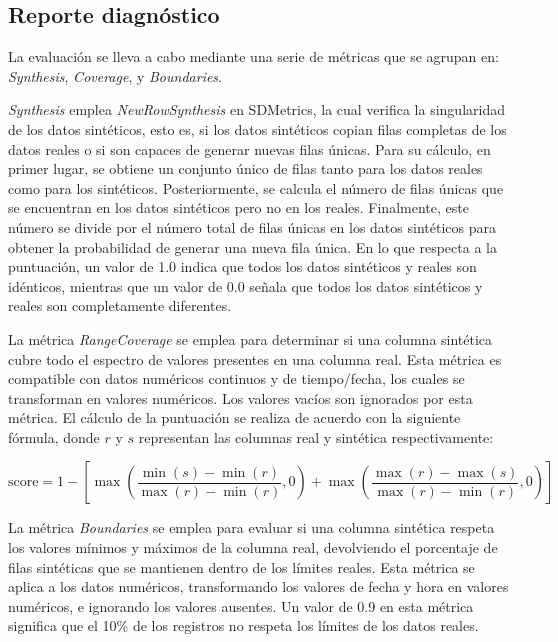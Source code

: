 \newpage

\newpage
\subsection{Reporte diagnóstico}
\label{Diagnostic Report}
La evaluación se lleva a cabo mediante una serie de métricas que se agrupan en: \emph{Synthesis}, \emph{Coverage}, y \emph{Boundaries}.

\emph{Synthesis} emplea \emph{NewRowSynthesis} en SDMetrics, la cual verifica la singularidad de los datos sintéticos, esto es, si los datos sintéticos copian filas completas de los datos reales o si son capaces de generar nuevas filas únicas. Para su cálculo, en primer lugar, se obtiene un conjunto único de filas tanto para los datos reales como para los sintéticos. Posteriormente, se calcula el número de filas únicas que se encuentran en los datos sintéticos pero no en los reales. Finalmente, este número se divide por el número total de filas únicas en los datos sintéticos para obtener la probabilidad de generar una nueva fila única. En lo que respecta a la puntuación, un valor de 1.0 indica que todos los datos sintéticos y reales son idénticos, mientras que un valor de 0.0 señala que todos los datos sintéticos y reales son completamente diferentes.

La métrica \emph{RangeCoverage} se emplea para determinar si una columna sintética cubre todo el espectro de valores presentes en una columna real. Esta métrica es compatible con datos numéricos continuos y de tiempo/fecha, los cuales se transforman en valores numéricos. Los valores vacíos son ignorados por esta métrica. El cálculo de la puntuación se realiza de acuerdo con la siguiente fórmula, donde \(r\) y \(s\) representan las columnas real y sintética respectivamente:

\[
\text{{score}} = 1 - \left[ \max\left(\frac{{\min(s) - \min(r)}}{{\max(r) - \min(r)}}, 0\right) + \max\left(\frac{{\max(r) - \max(s)}}{{\max(r) - \min(r)}}, 0\right) \right]
\]

La métrica \emph{Boundaries} se emplea para evaluar si una columna sintética respeta los valores mínimos y máximos de la columna real, devolviendo el porcentaje de filas sintéticas que se mantienen dentro de los límites reales. Esta métrica se aplica a los datos numéricos, transformando los valores de fecha y hora en valores numéricos, e ignorando los valores ausentes. Un valor de 0.9 en esta métrica significa que el 10\% de los registros no respeta los límites de los datos reales.

